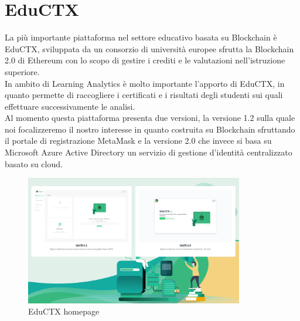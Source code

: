 \newpage
\section{EduCTX}
La più importante piattaforma nel settore educativo basata su Blockchain è EduCTX, sviluppata da un consorzio di università europee sfrutta la Blockchain 2.0 di Ethereum con lo scopo di gestire i crediti e le valutazioni nell'istruzione superiore.
\\In ambito di Learning Analytics è molto importante l'apporto di EduCTX, in quanto permette di raccogliere i certificati e i risultati degli studenti sui quali effettuare successivamente le analisi.
\\Al momento questa piattaforma presenta due versioni, la versione 1.2 sulla quale noi focalizzeremo il nostro interesse in quanto costruita su Blockchain
sfruttando il portale di registrazione MetaMask e la versione 2.0 che invece si basa su Microsoft Azure Active Directory un servizio di gestione d'identità centralizzato basato su cloud.
\begin{figure}[h]
    \centering
    \includegraphics[width=0.85\textwidth]{Immagini/EduCTX.PNG}
    \caption{EduCTX homepage}
\end{figure}

